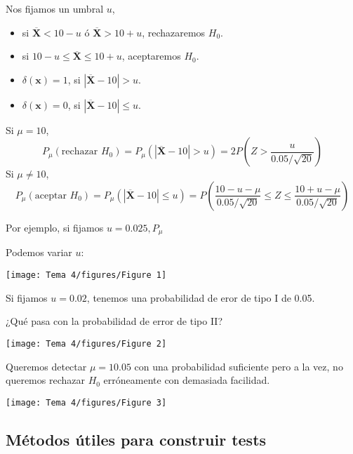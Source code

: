\begin{tcolorbox}[colback=blue!5!white, colframe=blue!75!black, title=\textbf{Nuestra regla}]
Nos fijamos un umbral $u$,
 \begin{itemize}[label=\textbullet]
    \item si $\mathbf{\overline{X}}<10-u$ ó $\mathbf{\overline{X}}>10+u$, rechazaremos $H_0$.
    \item si $10-u\le \mathbf{\overline{X}}\le 10+u$, aceptaremos $H_0$.
    \item $\delta(\mathbf{x})=1$, si $|\mathbf{\overline{X}}-10|>u$.
    \item $\delta(\mathbf{x})=0$, si $|\mathbf{\overline{X}}-10|\le u$.
\end{itemize}
\end{tcolorbox}
\begin{tcolorbox}[colback=blue!5!white, colframe=blue!75!black, title=\textbf{Calculamos las probabilidades de error}]
Si $\mu=10$, \[
P_\mu(\text{rechazar $H_0$})=P_\mu(|\mathbf{\overline{X}}-10|>u)=2P\left( Z>\dfrac{u}{0.05 /\sqrt{20} } \right) 
\] 
Si $\mu\neq 10$, \[
P_\mu(\text{aceptar $H_0$})=P_\mu(|\mathbf{\overline{X}}-10|\le u)=P\left( \dfrac{10-u-\mu}{0.05 /\sqrt{20} }\le Z\le \dfrac{10+u-\mu}{0.05 /\sqrt{20} } \right) 
\] 
\end{tcolorbox}
Por ejemplo, si fijamos $u=0.025,P_{\mu}$

Podemos variar $u$:
 \begin{center}
    \texttt{[image: Tema 4/figures/Figure 1]}
\end{center}
Si fijamos $u=0.02$, tenemos una probabilidad de eror de tipo I de 0.05.

¿Qué pasa con la probabilidad de error de tipo II?
 \begin{center}
    \texttt{[image: Tema 4/figures/Figure 2]}
\end{center}
Queremos detectar $\mu=10.05$ con una probabilidad suficiente pero a la vez, no queremos rechazar $H_0$ erróneamente con demasiada facilidad.
\begin{center}
    \texttt{[image: Tema 4/figures/Figure 3]}
\end{center}
\subsection{Métodos útiles para construir tests}
